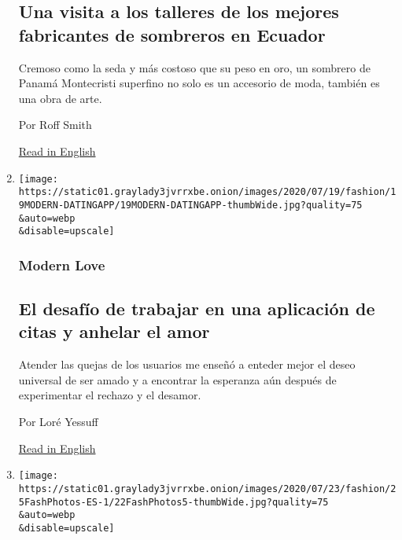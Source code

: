 \begin{enumerate}
{  \subsection{Una visita a los talleres de los mejores fabricantes de
  sombreros en
  Ecuador}\label{una-visita-a-los-talleres-de-los-mejores-fabricantes-de-sombreros-en-ecuador}}

  Cremoso como la seda y más costoso que su peso en oro, un sombrero de
  Panamá Montecristi superfino no solo es un accesorio de moda, también
  es una obra de arte.

  Por Roff Smith

  \href{https://www.nytimes3xbfgragh.onion/2020/07/20/travel/panama-hats-ecuador.html}{Read
  in English}
\item
  \href{/es/2020/07/26/espanol/estilos-de-vida/citas-en-linea-amor.html}{}

  \texttt{[image: https://static01.graylady3jvrrxbe.onion/images/2020/07/19/fashion/19MODERN-DATINGAPP/19MODERN-DATINGAPP-thumbWide.jpg?quality=75\\\&auto=webp\\\&disable=upscale]}

  \hypertarget{modern-love-1}{%
  \subsubsection{Modern Love}\label{modern-love-1}}

  \hypertarget{el-desafuxedo-de-trabajar-en-una-aplicaciuxf3n-de-citas-y-anhelar-el-amor}{%
  \subsection{El desafío de trabajar en una aplicación de citas y
  anhelar el
  amor}\label{el-desafuxedo-de-trabajar-en-una-aplicaciuxf3n-de-citas-y-anhelar-el-amor}}

  Atender las quejas de los usuarios me enseñó a enteder mejor el deseo
  universal de ser amado y a encontrar la esperanza aún después de
  experimentar el rechazo y el desamor.

  Por Loré Yessuff

  \href{https://www.nytimes3xbfgragh.onion/2020/07/17/style/modern-love-feel-love-worthy-working-for-dating-app.html}{Read
  in English}
\item
  \href{/es/2020/07/25/espanol/estilos-de-vida/gwyneth-paltrow-valentino.html}{}

  \texttt{[image: https://static01.graylady3jvrrxbe.onion/images/2020/07/23/fashion/25FashPhotos-ES-1/22FashPhotos5-thumbWide.jpg?quality=75\\\&auto=webp\\\&disable=upscale]}


\end{enumerate}
